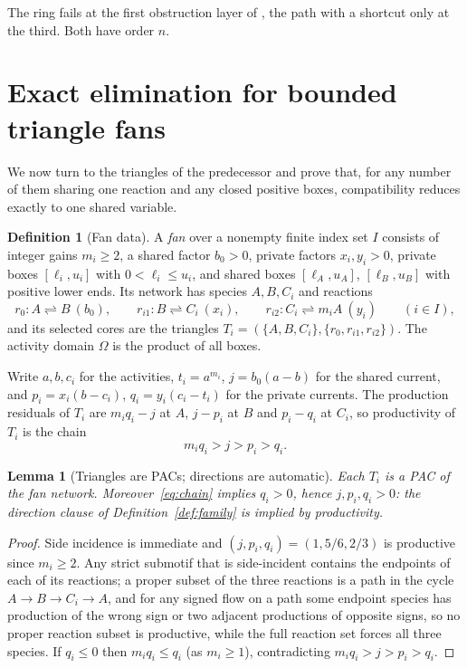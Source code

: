 \documentclass[11pt,a4paper]{article}
\theoremstyle{plain}
\newtheorem{lemma}[theorem]{Lemma}
\theoremstyle{definition}
\newtheorem{definition}[theorem]{Definition}
\theoremstyle{remark}
\newcommand{\rev}{\rightleftharpoons}
\begin{document}
The ring fails at the first obstruction layer of \citep{tcic2026}, the path with a shortcut only at the third. Both have order $n$.

\section{Exact elimination for bounded triangle fans}\label{sec:fan}

We now turn to the triangles of the predecessor and prove that, for any number of them sharing one reaction and any closed positive boxes, compatibility reduces exactly to one shared variable.

\begin{definition}[Fan data]\label{def:fan}
A \emph{fan} over a nonempty finite index set $I$ consists of integer gains $m_i\ge2$, a shared factor $b_0>0$, private factors $x_i,y_i>0$, private boxes $[\ell_i,u_i]$ with $0<\ell_i\le u_i$, and shared boxes $[\ell_A,u_A]$, $[\ell_B,u_B]$ with positive lower ends. Its network has species $A,B,C_i$ and reactions
\[
r_0\colon A\rev B\ (b_0),\qquad r_{i1}\colon B\rev C_i\ (x_i),\qquad r_{i2}\colon C_i\rev m_iA\ (y_i)\qquad(i\in I),
\]
and its selected cores are the triangles $T_i=(\{A,B,C_i\},\{r_0,r_{i1},r_{i2}\})$. The activity domain $\Omega$ is the product of all boxes.
\end{definition}

Write $a,b,c_i$ for the activities, $t_i=a^{m_i}$, $j=b_0(a-b)$ for the shared current, and $p_i=x_i(b-c_i)$, $q_i=y_i(c_i-t_i)$ for the private currents. The production residuals of $T_i$ are $m_iq_i-j$ at $A$, $j-p_i$ at $B$ and $p_i-q_i$ at $C_i$, so productivity of $T_i$ is the chain
\begin{equation}\label{eq:chain}
m_iq_i>j>p_i>q_i .
\end{equation}

\begin{lemma}[Triangles are PACs; directions are automatic]\label{lem:trianglePAC}
Each $T_i$ is a PAC of the fan network. Moreover~\eqref{eq:chain} implies $q_i>0$, hence $j,p_i,q_i>0$: the direction clause of Definition~\ref{def:family} is implied by productivity.
\end{lemma}
\begin{proof}
Side incidence is immediate and $(j,p_i,q_i)=(1,5/6,2/3)$ is productive since $m_i\ge2$. Any strict submotif that is side-incident contains the endpoints of each of its reactions; a proper subset of the three reactions is a path in the cycle $A\to B\to C_i\to A$, and for any signed flow on a path some endpoint species has production of the wrong sign or two adjacent productions of opposite signs, so no proper reaction subset is productive, while the full reaction set forces all three species. If $q_i\le0$ then $m_iq_i\le q_i$ (as $m_i\ge1$), contradicting $m_iq_i>j>p_i>q_i$.
\end{proof}
\end{document}
